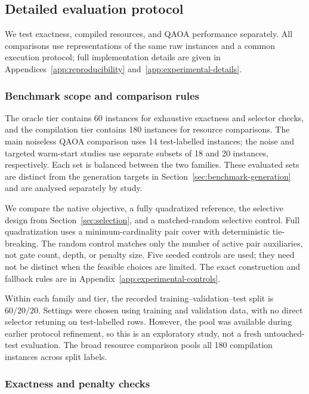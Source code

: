 \documentclass[a4paper,onecolumn,11pt,unpublished]{quantumarticle}
\theoremstyle{remark}
\begin{document}
\subsection{Detailed evaluation protocol}
\label{app:detailed-evaluation-protocol}

We test exactness, compiled resources, and QAOA performance separately. All
comparisons use representations of the same raw instances and a common
execution protocol; full implementation details are given in
Appendices~\ref{app:reproducibility} and~\ref{app:experimental-details}.

\subsubsection{Benchmark scope and comparison rules}
\label{sec:benchmark-tiers}

The oracle tier contains 60 instances for exhaustive exactness and selector
checks, and the compilation tier contains 180 instances for resource
comparisons. The main noiseless QAOA comparison uses 14 test-labelled
instances; the noise and targeted warm-start studies use separate subsets of
18 and 20 instances, respectively. Each set is balanced between the two
families. These evaluated sets are distinct from the generation targets in
Section~\ref{sec:benchmark-generation} and are analysed separately by study.

We compare the native objective, a fully quadratized reference, the selective
design from Section~\ref{sec:selection}, and a matched-random selective
control. Full quadratization uses a minimum-cardinality pair cover with
deterministic tie-breaking. The random control matches only the number of
active pair auxiliaries, not gate count, depth, or penalty size. Five seeded
controls are used; they need not be distinct when the feasible choices are
limited. The exact construction and fallback rules are in
Appendix~\ref{app:experimental-controls}.

Within each family and tier, the recorded training--validation--test split is
$60/20/20$. Settings were chosen using training and validation data, with no
direct selector retuning on test-labelled rows. However, the pool was
available during earlier protocol refinement, so this is an exploratory
study, not a fresh untouched-test evaluation. The broad resource comparison
pools all 180 compilation instances across split labels.

\subsubsection{Exactness and penalty checks}
\label{sec:exactness-protocol}
\end{document}
